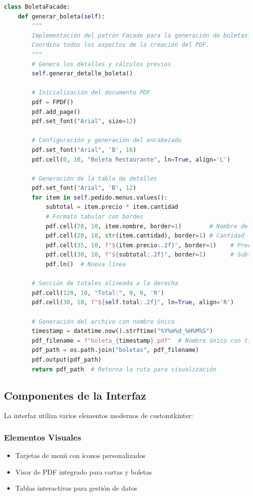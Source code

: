 \documentclass[12pt,letterpaper]{article}
\begin{document}
\begin{lstlisting}[language=Python, caption=Generación de Boletas]
class BoletaFacade:
    def generar_boleta(self):
        """
        Implementación del patrón Facade para la generación de boletas.
        Coordina todos los aspectos de la creación del PDF.
        """
        # Genera los detalles y cálculos previos
        self.generar_detalle_boleta()
        
        # Inicialización del documento PDF
        pdf = FPDF()
        pdf.add_page()
        pdf.set_font("Arial", size=12)
        
        # Configuración y generación del encabezado
        pdf.set_font("Arial", 'B', 16)
        pdf.cell(0, 10, "Boleta Restaurante", ln=True, align='L')
        
        # Generación de la tabla de detalles
        pdf.set_font("Arial", 'B', 12)
        for item in self.pedido.menus.values():
            subtotal = item.precio * item.cantidad
            # Formato tabular con bordes
            pdf.cell(70, 10, item.nombre, border=1)        # Nombre del ítem
            pdf.cell(20, 10, str(item.cantidad), border=1) # Cantidad
            pdf.cell(35, 10, f"${item.precio:.2f}", border=1)    # Precio unitario
            pdf.cell(30, 10, f"${subtotal:.2f}", border=1)       # Subtotal
            pdf.ln()  # Nueva línea
        
        # Sección de totales alineada a la derecha
        pdf.cell(120, 10, "Total:", 0, 0, 'R')
        pdf.cell(30, 10, f"${self.total:.2f}", ln=True, align='R')
        
        # Generación del archivo con nombre único
        timestamp = datetime.now().strftime("%Y%m%d_%H%M%S")
        pdf_filename = f"boleta_{timestamp}.pdf"  # Nombre único con timestamp
        pdf_path = os.path.join("boletas", pdf_filename)
        pdf.output(pdf_path)
        return pdf_path  # Retorna la ruta para visualización
\end{lstlisting}

\subsection{Componentes de la Interfaz}
La interfaz utiliza varios elementos modernos de customtkinter:

\subsubsection{Elementos Visuales}
\begin{itemize}
    \item Tarjetas de menú con íconos personalizados
    \item Visor de PDF integrado para cartas y boletas
    \item Tablas interactivas para gestión de datos
\end{itemize}
\end{document}
